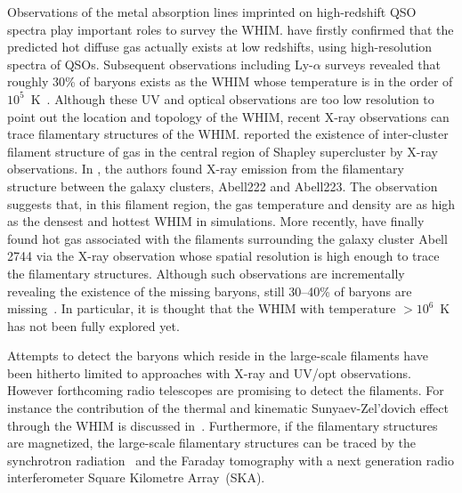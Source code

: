 \documentclass[a4paper,fleqn,usenatbib,useAMS]{mnras}
\begin{document}
Observations of the metal absorption lines imprinted on high-redshift QSO
spectra play important roles to survey the WHIM.
\citet{Tripp2001} have firstly confirmed that the predicted hot diffuse
gas actually exists at low redshifts, 
using high-resolution spectra of QSOs.
Subsequent observations including Ly-$\alpha$ surveys
revealed that roughly 30\% of baryons exists as the WHIM
whose temperature is in the order of $10^5$~K~\citep{Nicastro2008,Shull2012}.
Although these UV and optical observations are too low resolution to
point out the location and topology of the WHIM,
recent X-ray observations can trace filamentary structures of the WHIM. 
\citet{Kull1999} reported the existence of
inter-cluster filament structure of gas in the central region of Shapley supercluster
by X-ray observations. 
In \cite{Werner2008}, the authors found X-ray emission from 
the filamentary structure between the galaxy clusters, Abell222 and Abell223.
The observation suggests that, in this filament region, the gas temperature and
density are as high as
the densest and hottest WHIM in simulations.
More recently, \cite{Nature2015} have finally found hot gas associated
with the filaments surrounding the galaxy cluster Abell 2744 via the
X-ray observation whose spatial resolution is high enough to trace the filamentary structures. 
Although such observations are incrementally revealing the existence of
the missing baryons,
still 30--40\% of baryons are missing~\citep{2004ApJ...616..643F,Shull2012}.
In particular, it is thought that the WHIM with temperature $> 10^6$~K has not been fully explored yet.

Attempts to detect the baryons which reside in the large-scale filaments have been hitherto limited to approaches with X-ray and UV/opt observations. 
However forthcoming radio telescopes are promising to detect the filaments. 
For instance the contribution of the thermal and kinematic Sunyaev-Zel'dovich effect through the WHIM is discussed in~\citet{2006ApJ...643....1A,2008ApJ...674L..61A,2013A&A...550A.134P}.
Furthermore, if the filamentary structures are magnetized, the large-scale filamentary structures can be traced by the synchrotron radiation~\citep{2012MNRAS.423.2325A,2014MNRAS.445.3706V} and the Faraday tomography \citep{Akahori14} with a next generation radio interferometer Square Kilometre Array~(SKA). 
\end{document}
